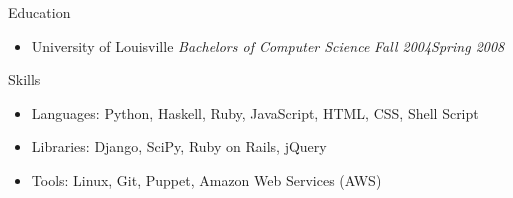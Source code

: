 \documentclass[11pt,oneside]{article}
\newenvironment{ressection}[1]{
    \textrm{\Large#1}
    \begin{itemize}
}{
    \end{itemize}
}
\newcommand{\resitem}[1]{
    \item \begin{flushleft} \textsf{#1} \end{flushleft}
}
\newcommand{\resbigitem}[3]{
    \item
    \textrm{#1}
    \hspace{5pt}
    \textit{#2}
    \hfill
    \textit{#3}
}
\begin{document}
\begin{ressection}{Education}

  \resbigitem{University of Louisville}{Bachelors of Computer Science}{Fall 2004\textendash Spring 2008}

\end{ressection}


\begin{ressection}{Skills}
    \resitem{
        \textrm{Languages:}
        Python,
        Haskell,
        Ruby,
        JavaScript,
        HTML,
        CSS,
        Shell Script
    }

    \resitem{
        \textrm{Libraries:}
        Django,
        SciPy,
        Ruby on Rails,
        jQuery
    }

    \resitem{
        \textrm{Tools:}
        Linux,
        Git,
        Puppet,
        Amazon Web Services (AWS)
    }
\end{ressection}
\end{document}
